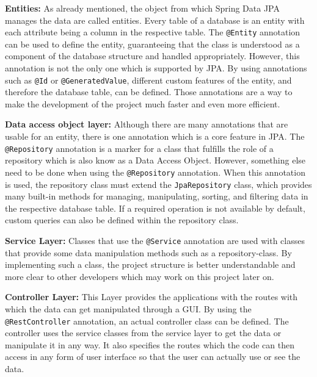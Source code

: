     \textbf{Entities:} \newline
    As already mentioned, the object from which Spring Data JPA manages the data are called entities. Every table of a database is an entity with each attribute being a column in the respective table. The \texttt{@Entity} annotation can be used to define the entity, guaranteeing that the class is understood as a component of the database structure and handled appropriately. However, this annotation is not the only one which is supported by JPA. By using annotations such as \texttt{@Id} or \texttt{@GeneratedValue}, different custom features of the entity, and therefore the database table, can be defined. Those annotations are a way to make the development of the project much faster and even more efficient. \Autocite{Andi:Entity1, Andi:Entity2, Andi:Entity3} \newline

    \textbf{Data access object layer:} \newline
    Although there are many annotations that are usable for an entity, there is one annotation which is a core feature in JPA. The \texttt{@Repository} annotation is a marker for a class that fulfills the role of a repository which is also know as a Data Access Object. However, something else need to be done when using the \texttt{@Repository} annotation.
    When this annotation is used, the repository class must extend the \texttt{JpaRepository} class, which provides many built-in methods for managing, manipulating, sorting, and filtering data in the respective database table. If a required operation is not available by default, custom queries can also be defined within the repository class. \Autocite{Andi:Repo} \newline 

    \textbf{Service Layer:} \newline
    Classes that use the \texttt{@Service} annotation are used with classes that provide some data manipulation methods such as a repository-class. By implementing such a class, the project structure is better understandable and more clear to other developers which may work on this project later on. \Autocite{Andi:ServiceLayer1,Andi:ServiceLayer2}  \newline 

    \textbf{Controller Layer:} \newline
    This Layer provides the applications with the routes with which the data can get manipulated through a GUI. By using the \texttt{@RestController} annotation, an actual controller class can be defined. The controller uses the service classes from the service layer to get the data or manipulate it in any way. It also specifies the routes which the code can then
    access in any form of user interface so that the user can actually use or see the data.
    \Autocite{Andi:ControllerLayer} \newline


